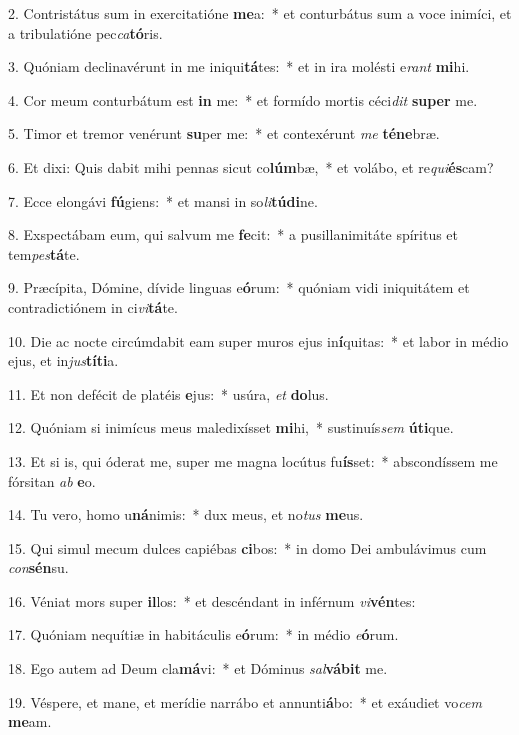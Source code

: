 2. Contristátus sum in exercitatióne \textbf{me}a:~*  et conturbátus sum a voce inimíci, et a tribulatióne pec\textit{ca}\textbf{tó}ris.\

3. Quóniam declinavérunt in me iniqui\textbf{tá}tes:~*  et in ira molésti e\textit{rant} \textbf{mi}hi.\

4. Cor meum conturbátum est \textbf{in} me:~*  et formído mortis céci\textit{dit} \textbf{su}\textbf{per} me.\

5. Timor et tremor venérunt \textbf{su}per me:~*  et contexérunt \textit{me} \textbf{té}\textbf{ne}bræ.\

6. Et dixi: Quis dabit mihi pennas sicut co\textbf{lúm}bæ,~*  et volábo, et re\textit{qui}\textbf{és}cam?\

7. Ecce elongávi \textbf{fú}giens:~*  et mansi in so\textit{li}\textbf{tú}\textbf{di}ne.\

8. Exspectábam eum, qui salvum me \textbf{fe}cit:~*  a pusillanimitáte spíritus et tem\textit{pes}\textbf{tá}te.\

9. Præcípita, Dómine, dívide linguas e\textbf{ó}rum:~*  quóniam vidi iniquitátem et contradictiónem in ci\textit{vi}\textbf{tá}te.\

10. Die ac nocte circúmdabit eam super muros ejus in\textbf{í}quitas:~*  et labor in médio ejus, et in\textit{jus}\textbf{tí}\textbf{ti}a.\

11. Et non defécit de platéis \textbf{e}jus:~*  usúra, \textit{et} \textbf{do}lus.\

12. Quóniam si inimícus meus maledixísset \textbf{mi}hi,~*  sustinuís\textit{sem} \textbf{ú}\textbf{ti}que.\

13. Et si is, qui óderat me, super me magna locútus fu\textbf{ís}set:~*  abscondíssem me fórsitan \textit{ab} \textbf{e}o.\

14. Tu vero, homo u\textbf{ná}nimis:~*  dux meus, et no\textit{tus} \textbf{me}us.\

15. Qui simul mecum dulces capiébas \textbf{ci}bos:~*  in domo Dei ambulávimus cum \textit{con}\textbf{sén}su.\

16. Véniat mors super \textbf{il}los:~*  et descéndant in inférnum \textit{vi}\textbf{vén}tes:\

17. Quóniam nequítiæ in habitáculis e\textbf{ó}rum:~*  in médio \textit{e}\textbf{ó}rum.\

18. Ego autem ad Deum cla\textbf{má}vi:~*  et Dóminus \textit{sal}\textbf{vá}\textbf{bit} me.\

19. Véspere, et mane, et merídie narrábo et annunti\textbf{á}bo:~*  et exáudiet vo\textit{cem} \textbf{me}am.\

